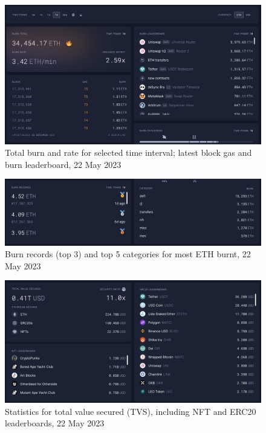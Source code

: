 \documentclass[UTF8]{article}
\begin{document}
\begin{figure}[htbp]
\begin{center}
\includegraphics[width=0.9\linewidth]{images/totalburn}
\caption{Total burn and rate for selected time interval; latest block gas and burn leaderboard, 22 May 2023}
\label{fig:totalburn}
\end{center}
\end{figure}

\begin{figure}[htbp]
\begin{center}
\includegraphics[width=0.9\linewidth]{images/records}
\caption{Burn records (top 3) and top 5 categories for most ETH burnt, 22 May 2023}
\label{fig:records}
\end{center}
\end{figure}

\begin{figure}[htbp]
\begin{center}
\includegraphics[width=0.9\linewidth]{images/tvs}
\caption{Statistics for total value secured (TVS), including NFT and ERC20 leaderboards, 22 May 2023}
\label{fig:tvs}
\end{center}
\end{figure}
\end{document}
